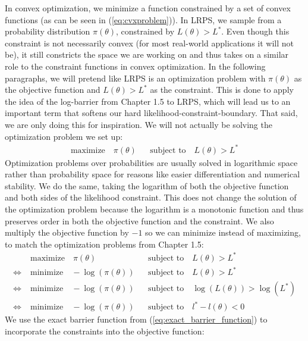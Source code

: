 \documentclass[12pt, a4paper]{report}
\begin{document}
In convex optimization, we minimize a function constrained by a set of convex functions (as can be seen in (\ref{eq:cvxproblem})).
In LRPS, we sample from a probability distribution $\pi(\theta)$, constrained by $L(\theta) > L^*$.
Even though this constraint is not necessarily convex (for most real-world applications it will not be), it still constricts the space we are working on and thus takes on a similar role to the constraint functions in convex optimization.
In the following paragraphs, we will pretend like LRPS is an optimization problem with $\pi(\theta)$ as the objective function and $L(\theta) > L^*$ as the constraint.
This is done to apply the idea of the log-barrier from Chapter 1.5 to LRPS, which will lead us to an important term that softens our hard likelihood-constraint-boundary.
That said, we are only doing this for inspiration.
We will not actually be solving the optimization problem we set up:
\begin{align}
    \textrm{maximize} \quad \pi(\theta) &&\textrm{subject to} \quad L(\theta) > L^* \nonumber
\end{align}
Optimization problems over probabilities are usually solved in logarithmic space rather than probability space for reasons like easier differentiation and numerical stability.
We do the same, taking the logarithm of both the objective function and both sides of the likelihood constraint.
This does not change the solution of the optimization problem because the logarithm is a monotonic function and thus preserves order in both the objective function and the constraint.
We also multiply the objective function by $-1$ so we can minimize instead of maximizing, to match the optimization problems from Chapter 1.5: %
\begin{align}
    &\textrm{maximize} \quad \pi(\theta) &&\textrm{subject to} \quad L(\theta) > L^* \nonumber \nonumber \\
    \iff \; &\textrm{minimize} \quad -\log(\pi(\theta)) &&\textrm{subject to} \quad L(\theta) > L^* \nonumber\\
    \iff \; &\textrm{minimize} \quad -\log(\pi(\theta)) &&\textrm{subject to} \quad \log(L(\theta)) > \log(L^*) \nonumber\\
    \iff \; &\textrm{minimize} \quad -\log(\pi(\theta)) &&\textrm{subject to} \quad l^* - l(\theta) < 0 \nonumber
\end{align}
We use the exact barrier function from (\ref{eq:exact_barrier_function}) to incorporate the constraints into the objective function:
\end{document}
